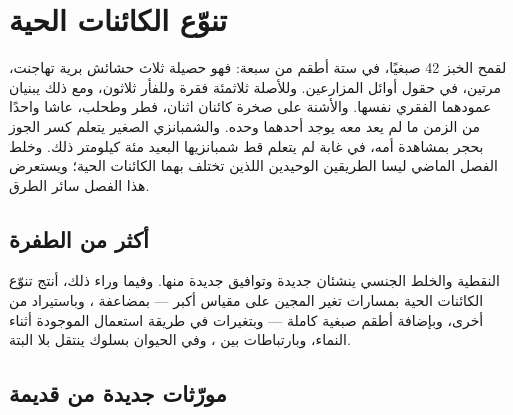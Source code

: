 \chapter{تنوّع الكائنات الحية}\label{ch:g12:diversification-of-life}

لقمح الخبز 42 صبغيًا، في ستة أطقم من سبعة: فهو حصيلة ثلاث حشائش برية
تهاجنت، مرتين، في حقول أوائل المزارعين. وللأصلة ثلاثمئة فقرة وللفأر
ثلاثون، ومع ذلك يبنيان عمودهما الفقري  نفسها. والأشنة على
صخرة كائنان اثنان، فطر وطحلب، عاشا واحدًا من الزمن ما لم يعد معه يوجد
أحدهما وحده. والشمبانزي الصغير يتعلم كسر الجوز بحجر بمشاهدة أمه، في
غابة لم يتعلم قط شمبانزيها البعيد مئة كيلومتر ذلك.  وخلط الفصل
الماضي ليسا الطريقين الوحيدين اللذين تختلف بهما الكائنات الحية؛
ويستعرض هذا الفصل سائر الطرق.

\section{أكثر من الطفرة}

\begin{proposition}\label{prop:g12:diversification-of-life:sources}
 النقطية والخلط الجنسي ينشئان  جديدة وتوافيق جديدة منها.
وفيما وراء ذلك، أنتج تنوّع الكائنات الحية بمسارات تغير المجين على
مقياس أكبر --- بمضاعفة ، وباستيراد  من  أخرى،
وبإضافة أطقم صبغية كاملة --- وبتغيرات في طريقة استعمال 
الموجودة أثناء النماء، وبارتباطات بين ، وفي الحيوان بسلوك ينتقل
بلا  البتة.
\end{proposition}
\admitted

\section{مورّثات جديدة من قديمة}

